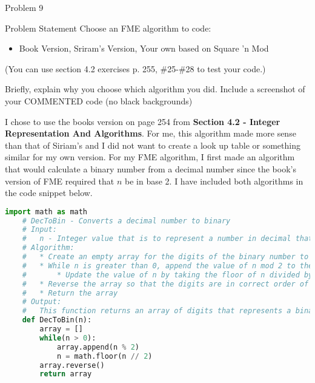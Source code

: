 \begin{problem}{Problem 9}
    \begin{statement}{Problem Statement}
        Choose an FME algorithm to code:
        
        \begin{itemize}
            \item Book Version, Sriram’s Version, Your own based on Square 'n Mod
        \end{itemize}
        (You can use section 4.2 exercises p. 255, \#25-\#28 to test your code.)

        Briefly, explain why you choose which algorithm you did. Include a screenshot of your COMMENTED code (no black backgrounds)
    \end{statement}

    \begin{Highlight}[Solution]
        I chose to use the books version on page 254 from \textbf{Section 4.2 - Integer Representation And Algorithms}. For me, this algorithm made more sense than that of Siriam's and I did not want
        to create a look up table or something similar for my own version. For my FME algorithm, I first made an algorithm that would calculate a binary number from a decimal number since the book's
        version of FME required that $n$ be in base 2. I have included both algorithms in the code snippet below.

    \begin{lstlisting}[style=stackoverflow, language=python]
    import math as math
    # DecToBin - Converts a decimal number to binary
    # Input:
    #   n - Integer value that is to represent a number in decimal that is to be converted to binary
    # Algorithm:
    #   * Create an empty array for the digits of the binary number to be stored in
    #   * While n is greater than 0, append the value of n mod 2 to the array
    #       * Update the value of n by taking the floor of n divided by 2
    #   * Reverse the array so that the digits are in correct order of the binary number
    #   * Return the array
    # Output:
    #   This function returns an array of digits that represents a binary number
    def DecToBin(n):
        array = []
        while(n > 0):
            array.append(n % 2)
            n = math.floor(n // 2)
        array.reverse()
        return array
        

\end{lstlisting}
\end{Highlight}
\end{problem}
